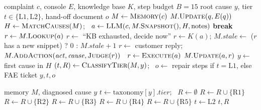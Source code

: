 \documentclass[12pt,a4paper]{article}
\begin{document}
\begin{algorithm}[t]
\caption{Topology-aware diagnosis}\label{alg:diag}
\small
\begin{algorithmic}[1]
\Require complaint $c$, console $E$, knowledge base $K$, step budget $B=15$
\Ensure root cause $y$, tier $t\in\{\mathrm{L1},\mathrm{L2}\}$, hand-off document $o$
\State $M \gets \textsc{Memory}(c)$
 
  \State $M.\textsc{Update}(q, E(q))$
\EndWhile
{}
  \State $H \gets \textsc{MatchCauses}(M)$; \ $a \gets \textsc{LLM}(c, M.\textsc{Snapshot}(), H, \text{notes})$
   \textbf{break} \EndIf
   $r \gets M.\textsc{Lookup}(a)$ 
   $r \gets$ ``KB exhausted, decide now''
   $r \gets K(a)$; $M.\mathit{stale} \gets$ ($r$ has a new snippet) ? $0$ : $M.\mathit{stale}+1$
    \State $r \gets$ customer reply; \ $M.\textsc{AddAction}(\mathit{act},\mathit{cause},\textsc{Judge}(r))$
  \Else\ $r \gets \textsc{Execute}(a)$
  \EndIf
  \State $M.\textsc{Update}(a, r)$
\EndFor
{} $y \gets$ first cause in $H$ \EndIf
\State $(t, R) \gets \textsc{ClassifyTier}(M, y)$; \ $o \gets$ repair steps if $t=\mathrm{L1}$, else FAE ticket
\State \Return $y, t, o$
\end{algorithmic}
\end{algorithm}

\begin{algorithm}[t]
\caption{\textsc{ClassifyTier}: taxonomy tier with policy override}\label{alg:tier}
\small
\begin{algorithmic}[1]
\Require memory $M$, diagnosed cause $y$
\State $t \gets \mathrm{taxonomy}[y].\mathit{tier}$; \ $R \gets \emptyset$
 $R \gets R \cup \{\mathrm{R1}\}$ \EndIf
{} $R \gets R \cup \{\mathrm{R2}\}$ \EndIf
{} $R \gets R \cup \{\mathrm{R3}\}$ \EndIf
{} $R \gets R \cup \{\mathrm{R4}\}$ \EndIf
{} $R \gets R \cup \{\mathrm{R5}\}$ \EndIf
{} $t \gets \mathrm{L2}$ \EndIf
\State \Return $t, R$
\end{algorithmic}
\end{algorithm}
\end{document}
